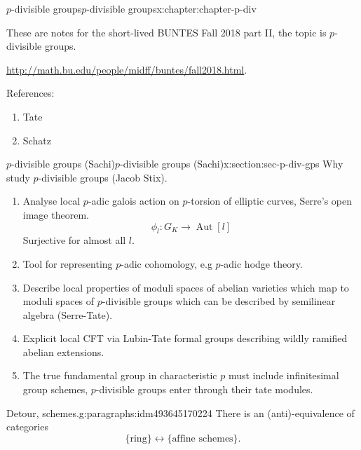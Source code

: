 \documentclass[oneside,10pt,]{book}
\numberwithin{equation}{section}
\newcommand{\lb}{[}
\newcommand{\rb}{]}
\DeclareMathOperator{\Aut}{Aut}
\begin{document}
\begin{chapterptx}{\(p\)-divisible groups}{}{\(p\)-divisible groups}{}{}{x:chapter:chapter-p-div}
\begin{introduction}{}%
These are notes for the short-lived BUNTES Fall 2018 part II, the topic is \(p\)-divisible groups.%
\par
\url{http://math.bu.edu/people/midff/buntes/fall2018.html}.%
\par
References:%
\begin{enumerate}
\item{}Tate%
\item{}Schatz%
\end{enumerate}
%
\end{introduction}%
%
%
\typeout{************************************************}
\typeout{************************************************}
%
\begin{sectionptx}{\(p\)-divisible groups (Sachi)}{}{\(p\)-divisible groups (Sachi)}{}{}{x:section:sec-p-div-gps}
Why study  \(p\)-divisible groups (Jacob Stix).%
\begin{enumerate}
\item{}Analyse local \(p\)-adic galois action on \(p\)-torsion of elliptic curves, Serre's open image theorem.%
\begin{equation*}
\phi_l \colon G_K \to \Aut \lb l \rb
\end{equation*}
Surjective for almost all \(l\).%
\item{}Tool for representing \(p\)-adic cohomology, e.g \(p\)-adic hodge theory.%
\item{}Describe local properties of moduli spaces of abelian varieties which map to moduli spaces of \(p\)-divisible groups which can be described by semilinear algebra (Serre-Tate).%
\item{}Explicit local CFT via Lubin-Tate formal groups describing wildly ramified abelian extensions.%
\item{}The true fundamental group in characteristic \(p\) must include infinitesimal group schemes, \(p\)-divisible groups enter through their tate modules.%
\end{enumerate}
%
\begin{paragraphs}{Detour, schemes.}{g:paragraphs:idm493645170224}%
There is an (anti)-equivalence of categories%
\begin{equation*}
\{\text{ring}\} \leftrightarrow\{\text{affine schemes}\}\text{.}
\end{equation*}

\end{paragraphs}
\end{sectionptx}
\end{chapterptx}
\end{document}
